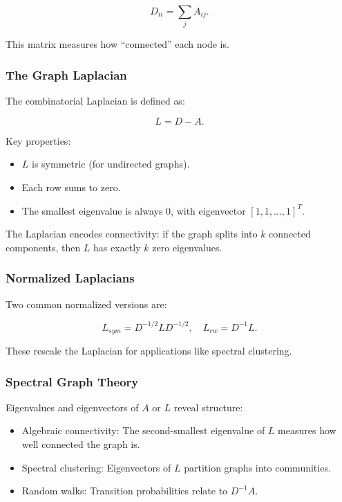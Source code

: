 \documentclass[
  letterpaper,
  DIV=11,
  numbers=noendperiod]{scrreprt}
\providecommand{\tightlist}{%
  \setlength{\itemsep}{0pt}\setlength{\parskip}{0pt}}
\begin{document}
\[
D_{ii} = \sum_j A_{ij}.
\]

This matrix measures how ``connected'' each node is.

\subsubsection{The Graph Laplacian}\label{the-graph-laplacian}

The combinatorial Laplacian is defined as:

\[
L = D - A.
\]

Key properties:

\begin{itemize}
\tightlist
\item
  \(L\) is symmetric (for undirected graphs).
\item
  Each row sums to zero.
\item
  The smallest eigenvalue is always 0, with eigenvector
  \([1, 1, \dots, 1]^T\).
\end{itemize}

The Laplacian encodes connectivity: if the graph splits into \(k\)
connected components, then \(L\) has exactly \(k\) zero eigenvalues.

\subsubsection{Normalized Laplacians}\label{normalized-laplacians}

Two common normalized versions are:

\[
L_{sym} = D^{-1/2} L D^{-1/2}, \quad L_{rw} = D^{-1} L.
\]

These rescale the Laplacian for applications like spectral clustering.

\subsubsection{Spectral Graph Theory}\label{spectral-graph-theory}

Eigenvalues and eigenvectors of \(A\) or \(L\) reveal structure:

\begin{itemize}
\tightlist
\item
  Algebraic connectivity: The second-smallest eigenvalue of \(L\)
  measures how well connected the graph is.
\item
  Spectral clustering: Eigenvectors of \(L\) partition graphs into
  communities.
\item
  Random walks: Transition probabilities relate to \(D^{-1}A\).
\end{itemize}
\end{document}
